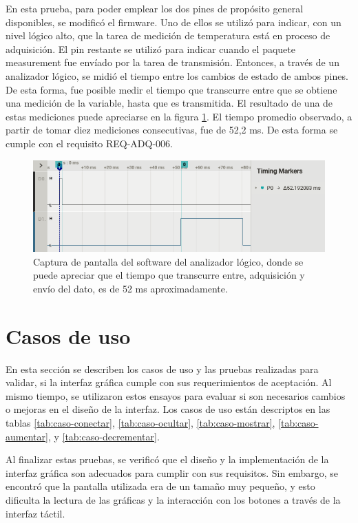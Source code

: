 En esta prueba, para poder emplear los dos pines de propósito general disponibles, se modificó el firmware. Uno de ellos se utilizó para indicar, con un nivel lógico alto, que la tarea de medición de temperatura está en proceso de adquisición. El pin restante se utilizó para indicar cuando el paquete measurement fue envíado por la tarea de transmisión. Entonces, a través de un analizador lógico, se midió el tiempo entre los cambios de estado de ambos pines. De esta forma, fue posible medir el tiempo que transcurre entre que se obtiene una medición de la variable, hasta que es transmitida. El resultado de una de estas mediciones puede apreciarse en la figura \ref{fig:tiempo-envio}. El tiempo promedio observado, a partir de tomar diez mediciones consecutivas, fue de 52,2 ms. De esta forma se cumple con el requisito REQ-ADQ-006.

\begin{figure}[htpb]
\centering
\includegraphics[width=\textwidth]{./Figures/tiempo-envio.png}
\caption{Captura de pantalla del software del analizador lógico, donde se puede apreciar que el tiempo que transcurre entre, adquisición y envío del dato, es de 52 ms aproximadamente.}
\label{fig:tiempo-envio}
\end{figure}

\section{Casos de uso}

En esta sección se describen los casos de uso y las pruebas realizadas para validar, si la interfaz gráfica cumple con sus requerimientos de aceptación. Al mismo tiempo, se utilizaron estos ensayos para evaluar si son necesarios cambios o mejoras en el diseño de la interfaz. Los casos de uso están descriptos en las tablas  \ref{tab:caso-conectar}, \ref{tab:caso-ocultar}, \ref{tab:caso-mostrar}, \ref{tab:caso-aumentar}, y \ref{tab:caso-decrementar}.

Al finalizar estas pruebas, se verificó que el diseño y la implementación de la interfaz gráfica son adecuados para cumplir con sus requisitos. Sin embargo, se encontró que la pantalla utilizada era de un tamaño muy pequeño, y esto dificulta la lectura de las gráficas y la interacción con los botones a través de la interfaz táctil.

